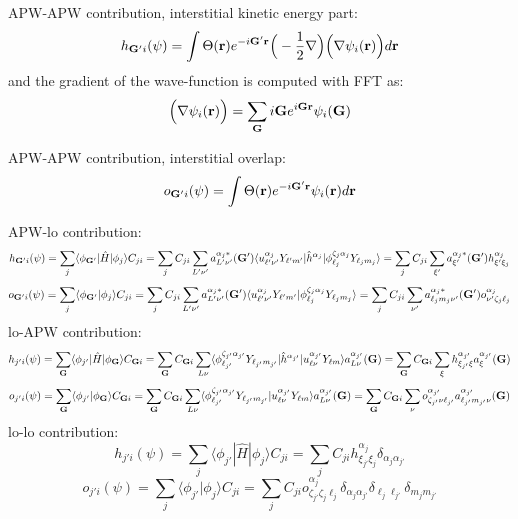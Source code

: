 A\+P\+W-\/\+A\+P\+W contribution, interstitial kinetic energy part\+: \[ h_{{\bf G'} i}(\psi) = \int \Theta({\bf r}) e^{-i{\bf G'}{\bf r}} \Big( -\frac{1}{2} \nabla \Big) \Big( \nabla \psi_{i}({\bf r}) \Big) d{\bf r} \] and the gradient of the wave-\/function is computed with F\+F\+T as\+: \[ \Big( \nabla \psi_{i}({\bf r}) \Big) = \sum_{\bf G} i{\bf G}e^{i{\bf G}{\bf r}}\psi_i({\bf G}) \]

A\+P\+W-\/\+A\+P\+W contribution, interstitial overlap\+: \[ o_{{\bf G'} i}(\psi) = \int \Theta({\bf r}) e^{-i{\bf G'}{\bf r}} \psi_{i}({\bf r}) d{\bf r} \]

A\+P\+W-\/lo contribution\+: \[ h_{{\bf G'} i}(\psi) = \sum_{j} \langle \phi_{\bf G'} | \hat H | \phi_{j} \rangle C_{j i} = \sum_{j} C_{j i} \sum_{L'\nu'} a_{L'\nu'}^{\alpha_j *}({\bf G'}) \langle u_{\ell' \nu'}^{\alpha_j}Y_{\ell' m'}|\hat h^{\alpha_j} | \phi_{\ell_j}^{\zeta_j \alpha_j} Y_{\ell_j m_j} \rangle = \sum_{j} C_{j i} \sum_{\xi'} a_{\xi'}^{\alpha_j *}({\bf G'}) h_{\xi' \xi_j}^{\alpha_j} \] \[ o_{{\bf G'} i}(\psi) = \sum_{j} \langle \phi_{\bf G'} | \phi_{j} \rangle C_{j i} = \sum_{j} C_{j i} \sum_{L'\nu'} a_{L'\nu'}^{\alpha_j *}({\bf G'}) \langle u_{\ell' \nu'}^{\alpha_j}Y_{\ell' m'}| \phi_{\ell_j}^{\zeta_j \alpha_j} Y_{\ell_j m_j} \rangle = \sum_{j} C_{j i} \sum_{\nu'} a_{\ell_j m_j \nu'}^{\alpha_j *}({\bf G'}) o_{\nu' \zeta_j \ell_j}^{\alpha_j} \] lo-\/\+A\+P\+W contribution\+: \[ h_{j' i}(\psi) = \sum_{\bf G} \langle \phi_{j'} | \hat H | \phi_{\bf G} \rangle C_{{\bf G} i} = \sum_{\bf G} C_{{\bf G} i} \sum_{L\nu} \langle \phi_{\ell_{j'}}^{\zeta_{j'} \alpha_{j'}} Y_{\ell_{j'} m_{j'}} |\hat h^{\alpha_{j'}} | u_{\ell \nu}^{\alpha_{j'}}Y_{\ell m} \rangle a_{L\nu}^{\alpha_{j'}}({\bf G}) = \sum_{\bf G} C_{{\bf G} i} \sum_{\xi} h_{\xi_{j'} \xi}^{\alpha_{j'}} a_{\xi}^{\alpha_{j'}}({\bf G}) \] \[ o_{j' i}(\psi) = \sum_{\bf G} \langle \phi_{j'} | \phi_{\bf G} \rangle C_{{\bf G} i} = \sum_{\bf G} C_{{\bf G} i} \sum_{L\nu} \langle \phi_{\ell_{j'}}^{\zeta_{j'} \alpha_{j'}} Y_{\ell_{j'} m_{j'}} | u_{\ell \nu}^{\alpha_{j'}}Y_{\ell m} \rangle a_{L\nu}^{\alpha_{j'}}({\bf G}) = \sum_{\bf G} C_{{\bf G} i} \sum_{\nu} o_{\zeta_{j'} \nu \ell_{j'}}^{\alpha_{j'}} a_{\ell_{j'} m_{j'} \nu}^{\alpha_{j'}}({\bf G}) \] lo-\/lo contribution\+: \[ h_{j' i}(\psi) = \sum_{j} \langle \phi_{j'} | \hat H | \phi_{j} \rangle C_{j i} = \sum_{j} C_{j i} h_{\xi_{j'} \xi_j}^{\alpha_j} \delta_{\alpha_j \alpha_{j'}} \] \[ o_{j' i}(\psi) = \sum_{j} \langle \phi_{j'} | \phi_{j} \rangle C_{j i} = \sum_{j} C_{j i} o_{\zeta_{j'} \zeta_{j} \ell_j}^{\alpha_j} \delta_{\alpha_j \alpha_{j'}} \delta_{\ell_j \ell_{j'}} \delta_{m_j m_{j'}} \] 

